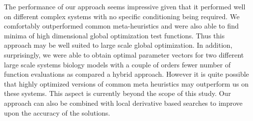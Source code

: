 \documentclass[12pt]{article}
\begin{document}
The performance of our approach seems impressive given that it performed well on different complex systems with no specific conditioning being required. We comfortably outperformed common meta-heuristics and were also able to find minima of high dimensional global optimization test functions. Thus this approach may be well suited to large scale global optimization. In addition, surprisingly, we were able to obtain optimal parameter vectors for two different large scale systems biology models with a couple of orders fewer number of function evaluations as compared a hybrid approach. However it is quite possible that highly optimized versions of common meta heuristics may outperform us on these systems. This aspect is currently beyond the scope of this study. Our approach can also be combined with local derivative based searches to improve upon the accuracy of the solutions.

\end{document}
